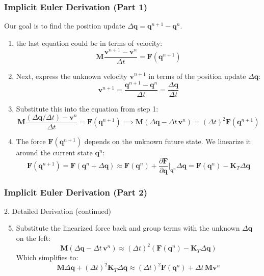 \documentclass{beamer}
\begin{document}
\begin{frame}[fragile]
\small
    \frametitle{Implicit Euler Derivation (Part 1)}
    
        Our goal is to find the position update $\Delta\mathbf{q} = \mathbf{q}^{n+1} - \mathbf{q}^n$.
        \begin{enumerate}
            \item the last equation could be in terms of velocity:
            \[
                \mathbf{M}\frac{\mathbf{v}^{n+1} - \mathbf{v}^n}{\Delta t} = \mathbf{F}(\mathbf{q}^{n+1})
            \]
            \item Next, express the unknown velocity $\mathbf{v}^{n+1}$ in terms of the position update $\Delta\mathbf{q}$:
            \[
                \mathbf{v}^{n+1} = \frac{\mathbf{q}^{n+1} - \mathbf{q}^n}{\Delta t} = \frac{\Delta\mathbf{q}}{\Delta t}
            \]
            \item Substitute this into the equation from step 1:
            \[
                \mathbf{M}\frac{(\Delta\mathbf{q}/\Delta t) - \mathbf{v}^n}{\Delta t} = \mathbf{F}(\mathbf{q}^{n+1}) \implies \mathbf{M}(\Delta\mathbf{q} - \Delta t\,\mathbf{v}^n) = (\Delta t)^2 \mathbf{F}(\mathbf{q}^{n+1})
            \]
            \item The force $\mathbf{F}(\mathbf{q}^{n+1})$ depends on the unknown future state. We linearize it around the current state $\mathbf{q}^n$:
            \[
                \mathbf{F}(\mathbf{q}^{n+1}) = \mathbf{F}(\mathbf{q}^n + \Delta\mathbf{q}) \approx \mathbf{F}(\mathbf{q}^n) + \frac{\partial \mathbf{F}}{\partial\mathbf{q}}\bigg|_{\mathbf{q}^n} \Delta\mathbf{q} = \mathbf{F}(\mathbf{q}^n) - \mathbf{K}_T \Delta\mathbf{q}
            \]
        \end{enumerate}
    
\end{frame}

\begin{frame}[fragile]
    \frametitle{Implicit Euler Derivation (Part 2)}
    \begin{block}{2. Detailed Derivation (continued)}
        \begin{enumerate}
            \setcounter{enumi}{4} 
            
            \item Substitute the linearized force back and group terms with the unknown $\Delta\mathbf{q}$ on the left:
            \[
                \mathbf{M}(\Delta\mathbf{q} - \Delta t\,\mathbf{v}^n) \approx (\Delta t)^2 (\mathbf{F}(\mathbf{q}^n) - \mathbf{K}_T \Delta\mathbf{q})
            \]
            Which simplifies to:
            \[
                \mathbf{M}\Delta\mathbf{q} + (\Delta t)^2 \mathbf{K}_T \Delta\mathbf{q} \approx (\Delta t)^2 \mathbf{F}(\mathbf{q}^n) + \Delta t\,\mathbf{M}\mathbf{v}^n
            \]
        \end{enumerate}
    \end{block}
\end{frame}
\end{document}
